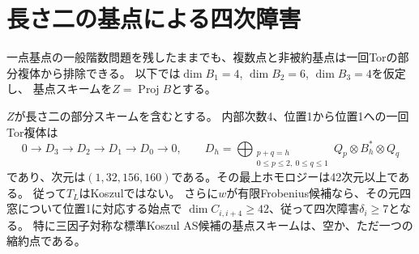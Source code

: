 \section{長さ二の基点による四次障害}
\label{sec:basepoint-length-two}
一点基点の一般階数問題を残したままでも、複数点と非被約基点は一回Torの部分複体から排除できる。
以下では$\dim B_1=4$, $\dim B_2=6$, $\dim B_3=4$を仮定し、
基点スキームを$Z=\operatorname{Proj}B$とする。

\begin{theorem}[長さ二の基点の排除]\label{thm:length-two-basepoint-obstruction}
$Z$が長さ二の部分スキームを含むとする。
内部次数4、位置1から位置1への一回Tor複体は
\[
 0\longrightarrow D_3\longrightarrow D_2\longrightarrow D_1
 \longrightarrow D_0\longrightarrow0,
 \qquad
 D_h=\bigoplus_{\substack{p+q=h\\0\leq p\leq2,\ 0\leq q\leq1}}
 Q_p\otimes B_h^*\otimes Q_q
\]
であり、次元は$(1,32,156,160)$である。その最上ホモロジーは42次元以上である。
従って$T_L$はKoszulではない。
さらに$w$が有限Frobenius候補なら、その元四窓について位置1に対応する始点で
$\dim C_{i,i+4}\geq42$、従って四次障害$\delta_i\geq7$となる。
特に三因子対称な標準Koszul AS候補の基点スキームは、空か、ただ一つの縮約点である。
\end{theorem}
